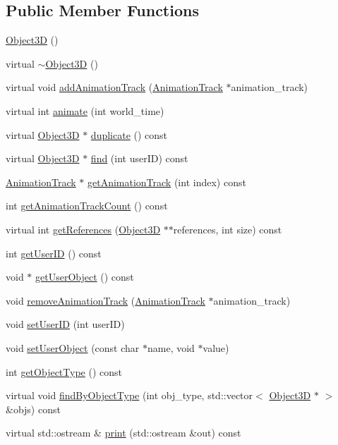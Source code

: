 \subsection*{Public Member Functions}
\begin{CompactItemize}
\item 
\hyperlink{classm3g_1_1Object3D_f4b10c33b9014a3f0a675ef4b699b773}{Object3D} ()
\item 
virtual \hyperlink{classm3g_1_1Object3D_8ece10725587e63a2c75283c16cc4df5}{$\sim$Object3D} ()
\item 
virtual void \hyperlink{classm3g_1_1Object3D_415c0b110f95410ded9b85e5d99a496b}{addAnimationTrack} (\hyperlink{classm3g_1_1AnimationTrack}{AnimationTrack} $\ast$animation\_\-track)
\item 
virtual int \hyperlink{classm3g_1_1Object3D_8aad1ceab4c2a03609c8a42324ce484d}{animate} (int world\_\-time)
\item 
virtual \hyperlink{classm3g_1_1Object3D}{Object3D} $\ast$ \hyperlink{classm3g_1_1Object3D_a25110dac934f867b83b73ad4741a0f4}{duplicate} () const 
\item 
virtual \hyperlink{classm3g_1_1Object3D}{Object3D} $\ast$ \hyperlink{classm3g_1_1Object3D_aa62f6aaac2e9359875f027ca05788ac}{find} (int userID) const 
\item 
\hyperlink{classm3g_1_1AnimationTrack}{AnimationTrack} $\ast$ \hyperlink{classm3g_1_1Object3D_f0978f3f2efe3227ca613da3361424dd}{getAnimationTrack} (int index) const 
\item 
int \hyperlink{classm3g_1_1Object3D_0926843b66090795972850376b8e4e6c}{getAnimationTrackCount} () const 
\item 
virtual int \hyperlink{classm3g_1_1Object3D_ddf91fbaaa866aa7aad5d530a69feba8}{getReferences} (\hyperlink{classm3g_1_1Object3D}{Object3D} $\ast$$\ast$references, int size) const 
\item 
int \hyperlink{classm3g_1_1Object3D_b8d9067364251d0208fcdc502d394e2c}{getUserID} () const 
\item 
void $\ast$ \hyperlink{classm3g_1_1Object3D_a9b8541216c1fa7792617218a5fb6672}{getUserObject} () const 
\item 
void \hyperlink{classm3g_1_1Object3D_e36d8f8544daee6bd4e2ccd6755ed03d}{removeAnimationTrack} (\hyperlink{classm3g_1_1AnimationTrack}{AnimationTrack} $\ast$animation\_\-track)
\item 
void \hyperlink{classm3g_1_1Object3D_5e4753e91dca5aa56abacb7fde69f332}{setUserID} (int userID)
\item 
void \hyperlink{classm3g_1_1Object3D_989411d827091f4a5e97e0377bbd1a7a}{setUserObject} (const char $\ast$name, void $\ast$value)
\item 
int \hyperlink{classm3g_1_1Object3D_06be1b37b707b5f227cba2308043f3df}{getObjectType} () const 
\item 
virtual void \hyperlink{classm3g_1_1Object3D_4dadb21b568b0230fac106f15040138c}{findByObjectType} (int obj\_\-type, std::vector$<$ \hyperlink{classm3g_1_1Object3D}{Object3D} $\ast$ $>$ \&objs) const 
\item 
virtual std::ostream \& \hyperlink{classm3g_1_1Object3D_6fea17fa1532df3794f8cb39cb4f911f}{print} (std::ostream \&out) const 
\end{CompactItemize}
